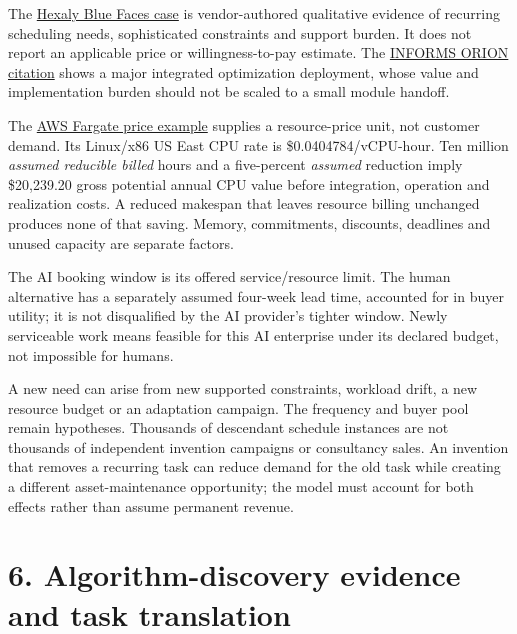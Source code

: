 \documentclass[
  10pt,
]{article}
\let\studysection\section
\renewcommand{\section}{\Needspace{7\baselineskip}\studysection}
\begin{document}
The
\href{https://www.hexaly.com/customers/how-bluefaces-solves-complex-project-scheduling-problems-in-minutes-with-hexaly}{Hexaly
Blue Faces case} is vendor-authored qualitative evidence of recurring
scheduling needs, sophisticated constraints and support burden. It does
not report an applicable price or willingness-to-pay estimate. The
\href{https://www.informs.org/Recognizing-Excellence/Award-Recipients/UPS-2016-Edelman}{INFORMS
ORION citation} shows a major integrated optimization deployment, whose
value and implementation burden should not be scaled to a small module
handoff.

The \href{https://aws.amazon.com/fargate/pricing/}{AWS Fargate price
example} supplies a resource-price unit, not customer demand. Its
Linux/x86 US East CPU rate is \$0.0404784/vCPU-hour. Ten million
\emph{assumed reducible billed} hours and a five-percent \emph{assumed}
reduction imply \$20,239.20 gross potential annual CPU value before
integration, operation and realization costs. A reduced makespan that
leaves resource billing unchanged produces none of that saving. Memory,
commitments, discounts, deadlines and unused capacity are separate
factors.

The AI booking window is its offered service/resource limit. The human
alternative has a separately assumed four-week lead time, accounted for
in buyer utility; it is not disqualified by the AI provider's tighter
window. Newly serviceable work means feasible for this AI enterprise
under its declared budget, not impossible for humans.

A new need can arise from new supported constraints, workload drift, a
new resource budget or an adaptation campaign. The frequency and buyer
pool remain hypotheses. Thousands of descendant schedule instances are
not thousands of independent invention campaigns or consultancy sales.
An invention that removes a recurring task can reduce demand for the old
task while creating a different asset-maintenance opportunity; the model
must account for both effects rather than assume permanent revenue.

\hypertarget{6-algorithm-discovery-evidence-and-task-translation}{%
\section{6. Algorithm-discovery evidence and task
translation}\label{6-algorithm-discovery-evidence-and-task-translation}}
\end{document}
